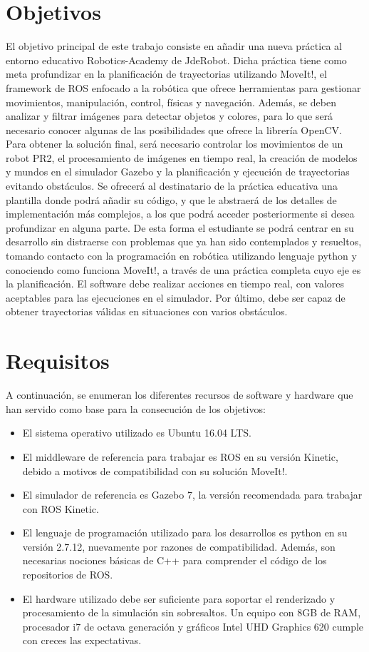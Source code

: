 \documentclass[12pt,spanish,chapterprefix, numbers=noenddot]{book}
\numberwithin{equation}{section}
\numberwithin{figure}{section}
\begin{document}
\section{Objetivos}
El objetivo principal de este trabajo consiste en añadir una nueva práctica al entorno educativo Robotics-Academy de JdeRobot. Dicha práctica tiene como meta profundizar en la planificación de trayectorias utilizando MoveIt!, el framework de ROS enfocado a la robótica que ofrece herramientas para gestionar movimientos, manipulación, control, físicas y navegación. Además, se deben analizar y filtrar imágenes para detectar objetos y colores, para lo que será necesario conocer algunas de las posibilidades que ofrece la librería OpenCV. 
Para obtener la solución final, será necesario controlar los movimientos de un robot PR2, el procesamiento de imágenes en tiempo real, la creación de modelos y mundos en el simulador Gazebo y la planificación y ejecución de trayectorias evitando obstáculos. Se ofrecerá al destinatario de la práctica educativa una plantilla donde podrá añadir su código, y que le abstraerá de los detalles de implementación más complejos, a los que podrá acceder posteriormente si desea profundizar en alguna parte. De esta forma el estudiante se podrá centrar en su desarrollo sin distraerse con problemas que ya han sido contemplados y resueltos, tomando contacto con la programación en robótica utilizando lenguaje python y conociendo como funciona MoveIt!, a través de una práctica completa cuyo eje es la planificación.
El software debe realizar acciones en tiempo real, con valores aceptables para las ejecuciones en el simulador. Por último, debe ser capaz de obtener trayectorias válidas en situaciones con varios obstáculos.

\section{Requisitos}
A continuación, se enumeran los diferentes recursos de software y hardware que han servido como base para la consecución de los objetivos: 
\begin{itemize}
    \item El sistema operativo utilizado es Ubuntu 16.04 LTS.
    \item El middleware de referencia para trabajar es ROS en su versión Kinetic, debido a motivos de compatibilidad con su solución MoveIt!.
    \item El simulador de referencia es Gazebo 7, la versión recomendada para trabajar con ROS Kinetic. 
    \item El lenguaje de programación utilizado para los desarrollos es python en su versión 2.7.12, nuevamente por razones de compatibilidad. Además, son necesarias nociones básicas de C++ para comprender el código de los repositorios de ROS. 
    \item El hardware utilizado debe ser suficiente para soportar el renderizado y procesamiento de la simulación sin sobresaltos. Un equipo con 8GB de RAM, procesador i7 de octava generación y gráficos Intel UHD Graphics 620 cumple con creces las expectativas.
\end{itemize}
\end{document}
